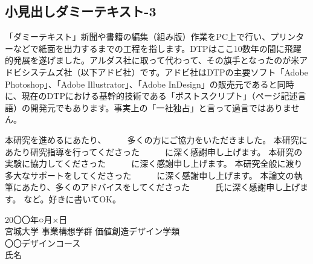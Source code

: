 \documentclass{cuxarticle}
\begin{document}
\subsection{小見出しダミーテキスト-3}
「ダミーテキスト」新聞や書籍の編集（組み版）作業をPC上で行い、プリンターなどで紙面を出力するまでの工程を指します。DTPはここ10数年の間に飛躍的発展を遂げました。アルダス社に取って代わって、その旗手となったのが米アドビシステムズ社（以下アドビ社）です。アドビ社はDTPの主要ソフト「Adobe Photoshop」、「Adobe Illustrator」、「Adobe InDesign」の販売元であると同時に、現在のDTPにおける基幹的技術である「ポストスクリプト」（ページ記述言語）の開発元でもあります。事実上の「一社独占」と言って過言ではありません。


本研究を進めるにあたり、　　　多くの方にご協力をいただきました。
本研究にあたり研究指導を行ってくださった　　　に深く感謝申し上げます。
本研究の実験に協力してくださった　　　に深く感謝申し上げます。
本研究全般に渡り多大なサポートをしてくださった　　　に深く感謝申し上げます。
本論文の執筆にあたり、多くのアドバイスをしてくださった　　　氏に深く感謝申し上げます。
など。好きに書いてOK。

\vspace{3\zh}
\begin{flushright}
  20〇〇年○月×日 \\
  宮城大学 事業構想学群 価値創造デザイン学類 \\
  〇〇デザインコース \\
  氏名
\end{flushright}

\newpage
\renewcommand{\refname}{\huge 参考文献}


\end{document}
